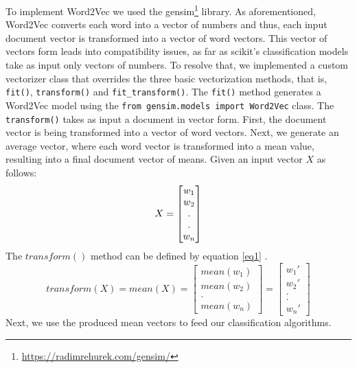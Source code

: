 To implement Word2Vec we used the gensim\footnote{\url{https://radimrehurek.com/gensim/}} library. As aforementioned, Word2Vec converts each word into a vector of numbers and thus, each input document vector is transformed into a vector of word vectors. This vector of vectors form leads into compatibility issues, as far as scikit's classification models take as input only vectors of numbers. To resolve that, we implemented a custom vectorizer class that overrides the three basic vectorization methods, that is, \texttt{fit()}, \texttt{transform()} and \texttt{fit\_transform()}. The \texttt{fit()} method generates a Word2Vec model using the \texttt{from gensim.models import Word2Vec} class. The \texttt{transform()} takes as input a document in vector form. First, the document vector is being transformed into a vector of word vectors. Next, we generate an average vector, where each word vector is transformed into a mean value, resulting into a final document vector of means. Given an input vector $X$ as follows:
\begin{equation*}
		X=
	\begin{bmatrix}
	w_1\\
	w_2\\
	.\\
	.\\
	w_n
	\end{bmatrix} 
	\space
\end{equation*}
The $transform()$ method  can be defined by equation \ref{eq1} .
\begin{equation}
\label{eq1}
	transform(X) = mean(X) =
	\begin{bmatrix}
	mean(w_1) \\
	mean(w_2) \\

	. \\
	mean(w_n)
	\end{bmatrix} 
	=
	\begin{bmatrix}
	w_1' \\
    w_2' \\
	. \\
	. \\
	w_n'
	\end{bmatrix} 
\end{equation}
Next, we use the produced mean vectors to feed our classification algorithms.